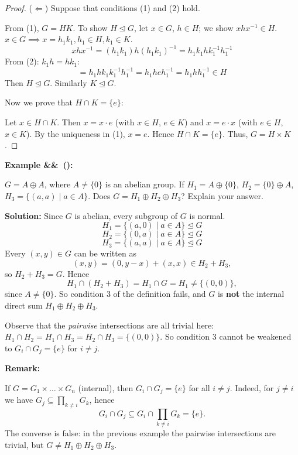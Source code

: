 \documentclass[11pt,a4paper]{article}
\newcounter{examplecnt}[section]
\newenvironment{example}[1][]{
	\stepcounter{examplecnt}
	\begin{examplebox}
		\textbf{\color{exampleColor}Example \arabic{examplecnt}\ifx&#1&\else\ (#1)\fi:} 
	}{
	\end{examplebox}
}
\newenvironment{remark}{
	\begin{remarkbox}
		\textbf{\color{remarkColor}Remark:} 
	}{
	\end{remarkbox}
}
\begin{document}
	\begin{proof}
		($\Leftarrow$) Suppose that conditions (1) and (2) hold.
		
		From (1), $G = HK$.
		To show $H \trianglelefteq G$, let $x \in G$, $h \in H$; we show $xhx^{-1} \in H$.
		$x \in G \implies x = h_1 k_1, h_1 \in H, k_1 \in K$.
		\[
		xhx^{-1} = (h_1 k_1) h (h_1 k_1)^{-1} = h_1 k_1 h k_1^{-1} h_1^{-1}
		\]
		From (2): $k_1 h = h k_1$:
		\[
		= h_1 h k_1 k_1^{-1} h_1^{-1} = h_1 h e h_1^{-1} = h_1 h h_1^{-1} \in H
		\]
		Then $H \trianglelefteq G$.
		Similarly $K \trianglelefteq G$.
		
		\noindent Now we prove that $H \cap K =\{e\}$:
		
		\noindent Let $x \in H \cap K$. Then $x = x \cdot e$ (with $x \in H$, $e \in K$) and
		$x = e \cdot x$ (with $e \in H$, $x \in K$). By the uniqueness in (1), $x = e$.
		Hence $H \cap K = \{e\}$.
		Thus, $G = H \times K$.
	\end{proof}
	
	\begin{example}
		$G = A \oplus A$, where $A \neq \{0\}$ is an abelian group.
		If $H_1 = A \oplus \{0\}$, $H_2 = \{0\} \oplus A$,
		$H_3 = \{(a, a) \mid a \in A\}$.
		Does $G = H_1 \oplus H_2 \oplus H_3$? Explain your answer.
	\end{example}
	
	\noindent \textbf{Solution:}
	Since $G$ is abelian, every subgroup of $G$ is normal.
	\[H_1 = \{(a, 0) \mid a \in A\} \trianglelefteq G\]
	\[H_2 = \{(0, a) \mid a \in A\} \trianglelefteq G\]
	\[H_3 = \{(a, a) \mid a \in A\} \trianglelefteq G\]
	Every $(x, y) \in G$ can be written as
	\[
	(x, y) = (0, y - x) + (x, x) \in H_2 + H_3,
	\]
	so $H_2 + H_3 = G$. Hence
	\[
	H_1 \cap (H_2 + H_3) = H_1 \cap G = H_1 \neq \{(0,0)\},
	\]
	since $A \neq \{0\}$. So condition 3 of the definition fails, and $G$ is \textbf{not} the internal direct sum $H_1 \oplus H_2 \oplus H_3$.
	
	\vspace{0.5em}
	\noindent Observe that the \emph{pairwise} intersections are all trivial here: $H_1 \cap H_2 = H_1 \cap H_3 = H_2 \cap H_3 = \{(0,0)\}$. So condition 3 cannot be weakened to $G_i \cap G_j = \{e\}$ for $i \neq j$.
	
	
	\begin{remark}
		If $G = G_1 \times \dots \times G_n$ (internal), then $G_i \cap G_j = \{e\}$ for all $i \neq j$.
		Indeed, for $j \neq i$ we have $G_j \subseteq \prod_{k \neq i} G_k$, hence
		\[
		G_i \cap G_j \subseteq G_i \cap \prod_{k \neq i} G_k = \{e\}.
		\]
		The converse is false: in the previous example the pairwise intersections are trivial, but $G \neq H_1 \oplus H_2 \oplus H_3$.
	\end{remark}
	
\end{document}
